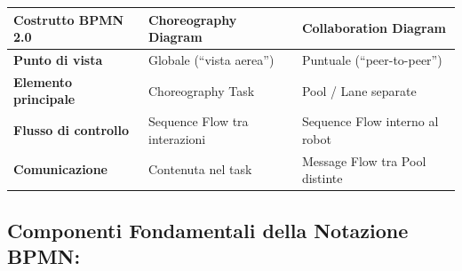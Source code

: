 ﻿\documentclass[11pt, a4paper]{report}
\begin{document}
\begin{table}[h!]
\centering
\small
\renewcommand{\arraystretch}{1.3}
\begin{tabularx}{\textwidth}{>{\bfseries}l X X}
\toprule
\rowcolor{lightBg}
Costrutto BPMN 2.0 & Choreography Diagram & Collaboration Diagram \\
\midrule
Punto di vista & Globale (``vista aerea'') & Puntuale (``peer-to-peer'') \\
Elemento principale & Choreography Task & Pool / Lane separate \\
Flusso di controllo & Sequence Flow tra interazioni & Sequence Flow interno al robot \\
Comunicazione & Contenuta nel task & Message Flow tra Pool distinte \\
\bottomrule
\end{tabularx}
\end{table}

\subsection{Componenti Fondamentali della Notazione BPMN:}
\end{document}
